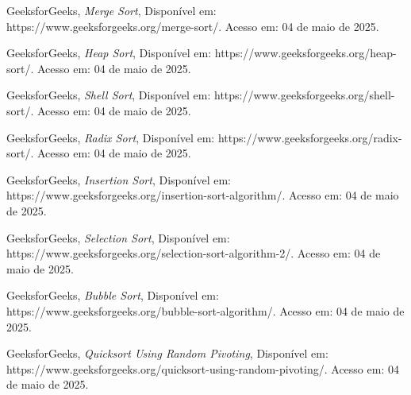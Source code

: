 \documentclass[a4paper, 12pt]{article}
\begin{document}
        \begin{thebibliography}{8}

        GeeksforGeeks,
        \emph{Merge Sort},
        Disponível em: {https://www.geeksforgeeks.org/merge-sort/}.
        Acesso em: 04 de maio de 2025.

        GeeksforGeeks,
        \emph{Heap Sort},
        Disponível em: {https://www.geeksforgeeks.org/heap-sort/}.
        Acesso em: 04 de maio de 2025.

        GeeksforGeeks,
        \emph{Shell Sort},
        Disponível em: {https://www.geeksforgeeks.org/shell-sort/}.
        Acesso em: 04 de maio de 2025.

        GeeksforGeeks,
        \emph{Radix Sort},
        Disponível em: {https://www.geeksforgeeks.org/radix-sort/}.
        Acesso em: 04 de maio de 2025.

        GeeksforGeeks,
        \emph{Insertion Sort},
        Disponível em: {https://www.geeksforgeeks.org/insertion-sort-algorithm/}.
        Acesso em: 04 de maio de 2025.

        GeeksforGeeks,
        \emph{Selection Sort},
        Disponível em: {https://www.geeksforgeeks.org/selection-sort-algorithm-2/}.
        Acesso em: 04 de maio de 2025.

        GeeksforGeeks,
        \emph{Bubble Sort},
        Disponível em: {https://www.geeksforgeeks.org/bubble-sort-algorithm/}.
        Acesso em: 04 de maio de 2025.

        GeeksforGeeks,
        \emph{Quicksort Using Random Pivoting},
        Disponível em: {https://www.geeksforgeeks.org/quicksort-using-random-pivoting/}.
        Acesso em: 04 de maio de 2025.

        \end{thebibliography}
\end{document}

